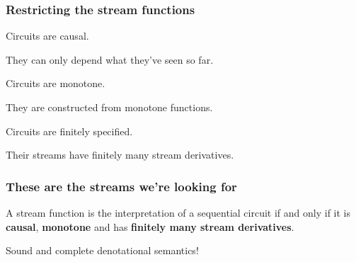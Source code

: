 \begin{frame}
    \frametitle{Restricting the stream functions}

    \await
    \Large
    Circuits are \alert{causal}.

    \await

    \normalsize
    They can only depend \alert{what they've seen so far}.

    \await

    \Large
    Circuits are \alert{monotone}.

    \await

    \normalsize
    They are constructed from \alert{monotone functions}.

    \await

    \Large
    Circuits are \alert{finitely specified}.

    \normalsize
    Their streams have \alert{finitely many stream derivatives}.


\end{frame}
\begin{frame}
    \frametitle{These are the streams we're looking for}

    \Large

    \begin{theorem}
        A stream function is the interpretation of a sequential circuit
        if and only if it is \textbf{causal}, \textbf{monotone} and has
        \textbf{finitely many stream derivatives}.
    \end{theorem}

    \await

    \begin{center}
        \LARGE
        Sound and complete
        \alert{denotational semantics}!
    \end{center}
\end{frame}